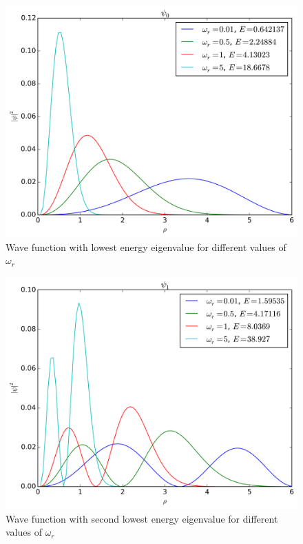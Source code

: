 \documentclass[11pt,a4paper,english,final]{article}
\numberwithin{equation}{section}
\newcommand{\figurewidth}{.85\textwidth}
\begin{document}




\begin{figure}
\centering
\includegraphics[width=\figurewidth]{../results/psi_compare_omegar0.png}
\caption{Wave function with lowest energy eigenvalue
for different values of $\omega_r$}
\label{fig:omegar0}
\end{figure}

\begin{figure}
\centering
\includegraphics[width=\figurewidth]{../results/psi_compare_omegar1.png}
\caption{Wave function with second lowest energy eigenvalue
for different values of $\omega_r$}
\label{fig:omegar1}
\end{figure}
\end{document}
